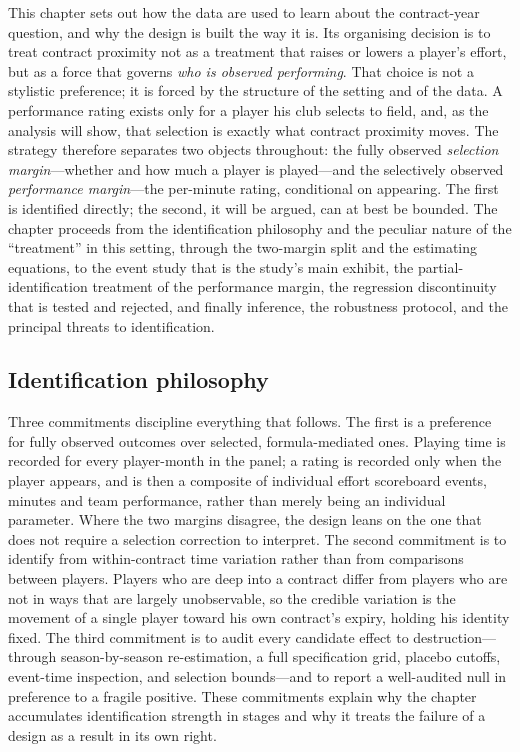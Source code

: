 \documentclass{article}
\begin{document}
This chapter sets out how the data are used to learn about the contract-year
question, and why the design is built the way it is. Its organising decision is to
treat contract proximity not as a treatment that raises or lowers a player's
effort, but as a force that governs \emph{who is observed performing}. That choice
is not a stylistic preference; it is forced by the structure of the setting and of
the data. A performance rating exists only for a player his club selects to field,
and, as the analysis will show, that selection is exactly what contract proximity
moves. The strategy therefore separates two objects throughout: the fully observed
\emph{selection margin}---whether and how much a player is played---and the
selectively observed \emph{performance margin}---the per-minute rating, conditional
on appearing. The first is identified directly; the second, it will be argued, can
at best be bounded. The chapter proceeds from the identification philosophy and the
peculiar nature of the ``treatment'' in this setting, through the two-margin split
and the estimating equations, to the event study that is the study's main exhibit,
the partial-identification treatment of the performance margin, the regression
discontinuity that is tested and rejected, and finally inference, the robustness
protocol, and the principal threats to identification.

\subsection{Identification philosophy}
\label{sec:strategy-philosophy}

Three commitments discipline everything that follows. The first is a preference for
fully observed outcomes over selected, formula-mediated ones. Playing time is
recorded for every player-month in the panel; a rating is recorded only when the
player appears, and is then a composite of individual effort scoreboard events, minutes and team performance, rather than merely being an individual parameter. Where the two
margins disagree, the design leans on the one that does not require a selection
correction to interpret. The second commitment is to identify from within-contract
time variation rather than from comparisons between players. Players who are deep
into a contract differ from players who are not in ways that are largely
unobservable, so the credible variation is the movement of a single player toward
his own contract's expiry, holding his identity fixed. The third commitment is to
audit every candidate effect to destruction---through season-by-season
re-estimation, a full specification grid, placebo cutoffs, event-time inspection,
and selection bounds---and to report a well-audited null in preference to a fragile
positive. These commitments explain why the chapter accumulates identification
strength in stages and why it treats the failure of a design as a result in its own
right.
\end{document}
